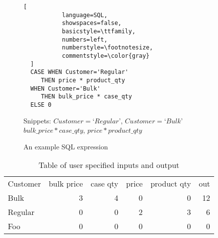 \begin{figure}
\caption{An example SQL expression}
\label{fig:1}
\begin{lstlisting}[
           language=SQL,
           showspaces=false,
           basicstyle=\ttfamily,
           numbers=left,
           numberstyle=\footnotesize,
           commentstyle=\color{gray}
  ]
  CASE WHEN Customer='Regular'
     THEN price * product_qty
  WHEN Customer='Bulk' 
     THEN bulk_price * case_qty
  ELSE 0
\end{lstlisting}

Snippets: 
$Customer=$`$Regular$', $Customer=$`$Bulk$'
$bulk\_price * case\_qty$, $price * product\_qty$
\end{figure}

\begin{table}[h!]
\centering
\begin{tabular}{ |l|r|r|r|r|r| }
\hline
Customer & bulk price & case qty & price & product qty & out \\
Bulk & 3 & 4 & 0 & 0 & 12 \\
Regular & 0 & 0 & 2 & 3 & 6 \\
Foo & 0 & 0 & 0 & 0 & 0 \\
\hline
\end{tabular}
\caption{Table of user specified inputs and output}
\label{table:1}
\end{table}


